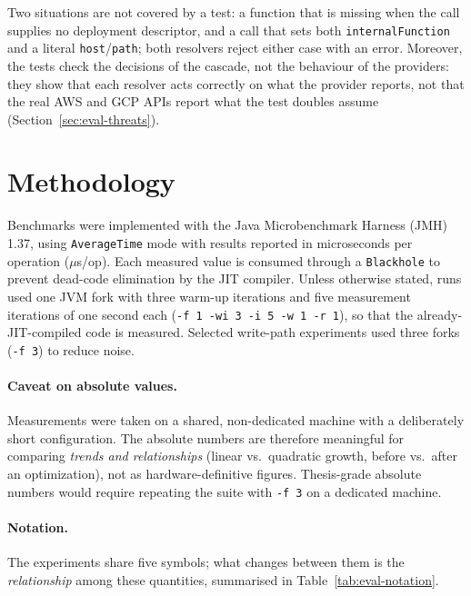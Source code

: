 Two situations are not covered by a test: a function that is missing when the call supplies no
deployment descriptor, and a call that sets both \texttt{internalFunction} and a literal
\texttt{host}/\texttt{path}; both resolvers reject either case with an error. Moreover, the tests
check the decisions of the cascade, not the behaviour of the providers: they show that each resolver
acts correctly on what the provider reports, not that the real AWS and GCP APIs report what the
test doubles assume (Section~\ref{sec:eval-threats}).

\section{Methodology}
\label{sec:eval-methodology}

Benchmarks were implemented with the Java Microbenchmark Harness (JMH) 1.37, using
\texttt{AverageTime} mode with results reported in microseconds per operation ($\mu$s/op). Each
measured value is consumed through a \texttt{Blackhole} to prevent dead-code elimination by the
JIT compiler. Unless otherwise stated, runs used one JVM fork with three warm-up iterations and
five measurement iterations of one second each (\texttt{-f 1 -wi 3 -i 5 -w 1 -r 1}), so that the
already-JIT-compiled code is measured. Selected write-path experiments used three forks
(\texttt{-f 3}) to reduce noise.

\paragraph{Caveat on absolute values.}
Measurements were taken on a shared, non-dedicated machine with a deliberately short
configuration. The absolute numbers are therefore meaningful for comparing \emph{trends and
relationships} (linear vs.\ quadratic growth, before vs.\ after an optimization), not as
hardware-definitive figures. Thesis-grade absolute numbers would require repeating the suite with
\texttt{-f 3} on a dedicated machine.

\paragraph{Notation.}
The experiments share five symbols; what changes between them is the \emph{relationship} among
these quantities, summarised in Table~\ref{tab:eval-notation}.

